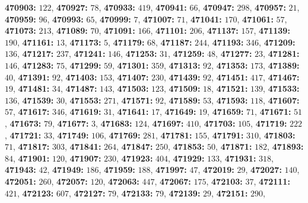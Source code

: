 \textsf{\bfseries 470903:} $122$, \textsf{\bfseries 470927:} $78$, \textsf{\bfseries 470933:} $419$, \textsf{\bfseries 470941:} $66$, \textsf{\bfseries 470947:} $298$, \textsf{\bfseries 470957:} $21$, \textsf{\bfseries 470959:} $96$, \textsf{\bfseries 470993:} $65$, \textsf{\bfseries 470999:} $7$, \textsf{\bfseries 471007:} $71$, \textsf{\bfseries 471041:} $170$, \textsf{\bfseries 471061:} $57$, \textsf{\bfseries 471073:} $213$, \textsf{\bfseries 471089:} $70$, \textsf{\bfseries 471091:} $166$, \textsf{\bfseries 471101:} $206$, \textsf{\bfseries 471137:} $157$, \textsf{\bfseries 471139:} $190$, \textsf{\bfseries 471161:} $13$, \textsf{\bfseries 471173:} $5$, \textsf{\bfseries 471179:} $68$, \textsf{\bfseries 471187:} $244$, \textsf{\bfseries 471193:} $346$, \textsf{\bfseries 471209:} $136$, \textsf{\bfseries 471217:} $237$, \textsf{\bfseries 471241:} $146$, \textsf{\bfseries 471253:} $31$, \textsf{\bfseries 471259:} $48$, \textsf{\bfseries 471277:} $23$, \textsf{\bfseries 471281:} $146$, \textsf{\bfseries 471283:} $75$, \textsf{\bfseries 471299:} $59$, \textsf{\bfseries 471301:} $359$, \textsf{\bfseries 471313:} $92$, \textsf{\bfseries 471353:} $173$, \textsf{\bfseries 471389:} $40$, \textsf{\bfseries 471391:} $92$, \textsf{\bfseries 471403:} $153$, \textsf{\bfseries 471407:} $230$, \textsf{\bfseries 471439:} $92$, \textsf{\bfseries 471451:} $417$, \textsf{\bfseries 471467:} $19$, \textsf{\bfseries 471481:} $34$, \textsf{\bfseries 471487:} $143$, \textsf{\bfseries 471503:} $123$, \textsf{\bfseries 471509:} $18$, \textsf{\bfseries 471521:} $139$, \textsf{\bfseries 471533:} $136$, \textsf{\bfseries 471539:} $30$, \textsf{\bfseries 471553:} $271$, \textsf{\bfseries 471571:} $92$, \textsf{\bfseries 471589:} $53$, \textsf{\bfseries 471593:} $118$, \textsf{\bfseries 471607:} $57$, \textsf{\bfseries 471617:} $346$, \textsf{\bfseries 471619:} $31$, \textsf{\bfseries 471641:} $17$, \textsf{\bfseries 471649:} $19$, \textsf{\bfseries 471659:} $71$, \textsf{\bfseries 471671:} $51$, \textsf{\bfseries 471673:} $79$, \textsf{\bfseries 471677:} $3$, \textsf{\bfseries 471683:} $124$, \textsf{\bfseries 471697:} $410$, \textsf{\bfseries 471703:} $105$, \textsf{\bfseries 471719:} $222$, \textsf{\bfseries 471721:} $33$, \textsf{\bfseries 471749:} $106$, \textsf{\bfseries 471769:} $281$, \textsf{\bfseries 471781:} $155$, \textsf{\bfseries 471791:} $310$, \textsf{\bfseries 471803:} $71$, \textsf{\bfseries 471817:} $303$, \textsf{\bfseries 471841:} $264$, \textsf{\bfseries 471847:} $250$, \textsf{\bfseries 471853:} $50$, \textsf{\bfseries 471871:} $182$, \textsf{\bfseries 471893:} $84$, \textsf{\bfseries 471901:} $120$, \textsf{\bfseries 471907:} $230$, \textsf{\bfseries 471923:} $404$, \textsf{\bfseries 471929:} $133$, \textsf{\bfseries 471931:} $318$, \textsf{\bfseries 471943:} $42$, \textsf{\bfseries 471949:} $186$, \textsf{\bfseries 471959:} $188$, \textsf{\bfseries 471997:} $47$, \textsf{\bfseries 472019:} $29$, \textsf{\bfseries 472027:} $140$, \textsf{\bfseries 472051:} $260$, \textsf{\bfseries 472057:} $120$, \textsf{\bfseries 472063:} $447$, \textsf{\bfseries 472067:} $175$, \textsf{\bfseries 472103:} $37$, \textsf{\bfseries 472111:} $421$, \textsf{\bfseries 472123:} $607$, \textsf{\bfseries 472127:} $79$, \textsf{\bfseries 472133:} $79$, \textsf{\bfseries 472139:} $29$, \textsf{\bfseries 472151:} $290$, 
